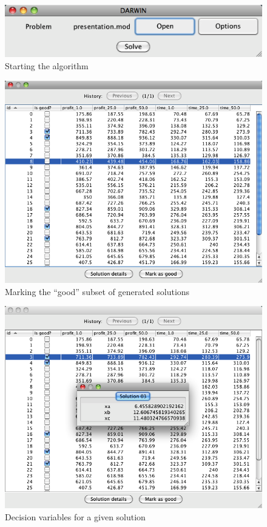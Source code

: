 \begin{figure}[htb]
  \centering
  \includegraphics[scale=0.7]{img/manual/03_problem_selected}
  \caption{Starting the algorithm}
  \label{manual_03_selected}
\end{figure}

\begin{figure}
  \centering
  \includegraphics[scale=0.7]{img/manual/04_marking_solutions}
  \caption{Marking the ``good'' subset of generated solutions}
  \label{manual_04_mark_as_good}
\end{figure}

\begin{figure}
  \centering
  \includegraphics[scale=0.7]{img/manual/05_solution_details}
  \caption{Decision variables for a given solution}
  \label{manual_05_dec_var}
\end{figure}

